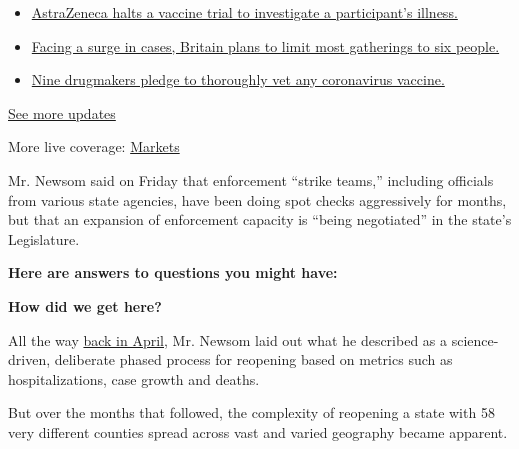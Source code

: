 \begin{itemize}
\tightlist
\item
  \href{https://www.nytimes3xbfgragh.onion/2020/09/08/world/covid-19-coronavirus.html?action=click\&pgtype=Article\&state=default\&region=MAIN_CONTENT_1\&context=storylines_live_updates\#link-313b443d}{AstraZeneca
  halts a vaccine trial to investigate a participant's illness.}
\item
  \href{https://www.nytimes3xbfgragh.onion/2020/09/08/world/covid-19-coronavirus.html?action=click\&pgtype=Article\&state=default\&region=MAIN_CONTENT_1\&context=storylines_live_updates\#link-4438dd7}{Facing
  a surge in cases, Britain plans to limit most gatherings to six
  people.}
\item
  \href{https://www.nytimes3xbfgragh.onion/2020/09/08/world/covid-19-coronavirus.html?action=click\&pgtype=Article\&state=default\&region=MAIN_CONTENT_1\&context=storylines_live_updates\#link-679303d7}{Nine
  drugmakers pledge to thoroughly vet any coronavirus vaccine.}
\end{itemize}

\href{https://www.nytimes3xbfgragh.onion/2020/09/08/world/covid-19-coronavirus.html?action=click\&pgtype=Article\&state=default\&region=MAIN_CONTENT_1\&context=storylines_live_updates}{See
more updates}

More live coverage:
\href{https://www.nytimes3xbfgragh.onion/live/2020/09/08/business/stock-market-today-coronavirus?action=click\&pgtype=Article\&state=default\&region=MAIN_CONTENT_1\&context=storylines_live_updates}{Markets}

Mr. Newsom said on Friday that enforcement ``strike teams,'' including
officials from various state agencies, have been doing spot checks
aggressively for months, but that an expansion of enforcement capacity
is ``being negotiated'' in the state's Legislature.

\textbf{Here are answers to questions you might have:}

\textbf{How did we get here?}

All the way
\href{https://www.nytimes3xbfgragh.onion/article/coronavirus-california-reopening-phases.html}{back
in April}, Mr. Newsom laid out what he described as a science-driven,
deliberate phased process for reopening based on metrics such as
hospitalizations, case growth and deaths.

But over the months that followed, the complexity of reopening a state
with 58 very different counties spread across vast and varied geography
became apparent.


